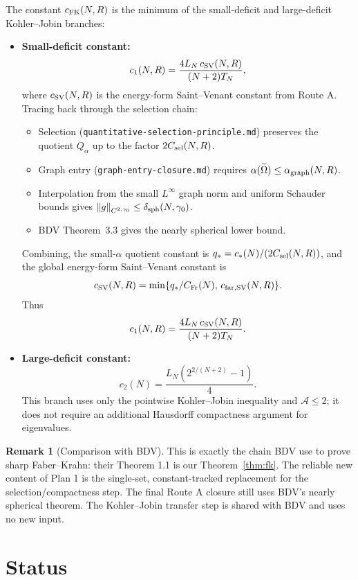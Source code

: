 \documentclass[11pt]{article}
\theoremstyle{definition}
\newtheorem{remark}[theorem]{Remark}
\newcommand{\norm}[1]{\left\|#1\right\|}
\begin{document}
The constant $c_{\rm FK}(N,R)$ is the minimum of the small-deficit and
large-deficit Kohler--Jobin branches:

\begin{itemize}
\item \textbf{Small-deficit constant:}
\[
c_1(N,R)=\frac{4L_N\,c_{\rm SV}(N,R)}{(N+2)T_N},
\]
where \(c_{\rm SV}(N,R)\) is the energy-form Saint--Venant constant from
Route A. Tracing back through the selection chain:
\begin{itemize}
\item Selection (\texttt{quantitative-selection-principle.md}) preserves
the quotient $Q_\alpha$ up to the factor \(2C_{\rm sel}(N,R)\).
\item Graph entry (\texttt{graph-entry-closure.md}) requires
$\alpha(\widetilde\Omega)\le\alpha_{\rm graph}(N,R)$.
\item Interpolation from the small \(L^\infty\) graph norm and uniform
Schauder bounds gives
\(\norm{g}_{C^{2,\gamma_0}}\le\delta_{\rm sph}(N,\gamma_0)\).
\item BDV Theorem~3.3 gives the nearly spherical lower bound.
\end{itemize}
Combining, the small-\(\alpha\) quotient constant is
\(q_*=c_*(N)/(2C_{\rm sel}(N,R))\), and the global energy-form
Saint--Venant constant is
\[
c_{\rm SV}(N,R)=
\min\{q_*/C_{\rm Fr}(N),\,c_{\rm far,SV}(N,R)\}.
\]
Thus
\[
c_1(N,R)=\frac{4L_N\,c_{\rm SV}(N,R)}{(N+2)T_N}.
\]
\item \textbf{Large-deficit constant:}
\[
c_2(N)=\frac{L_N(2^{2/(N+2)}-1)}{4}.
\]
This branch uses only the pointwise Kohler--Jobin inequality and
\(\mathcal A\le2\); it does not require an additional Hausdorff compactness
argument for eigenvalues.
\end{itemize}

\begin{remark}[Comparison with BDV]
This is exactly the chain BDV use to prove sharp Faber--Krahn: their Theorem
1.1 is our Theorem~\ref{thm:fk}. The reliable new content of Plan 1 is the
single-set, constant-tracked replacement for the selection/compactness step.
The final Route A closure still uses BDV's nearly spherical theorem. The
Kohler--Jobin transfer step is shared with BDV and uses no new input.
\end{remark}

\section{Status}
\end{document}
